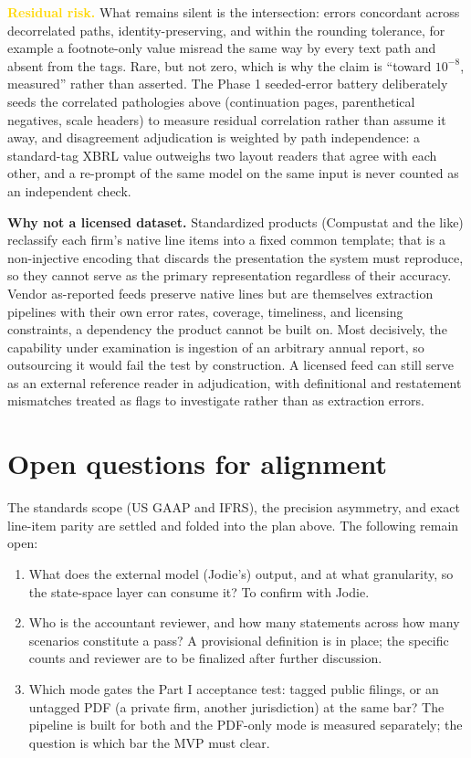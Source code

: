 \documentclass[11pt]{article}
\newcommand{\lead}[2]{\par\addvspace{5pt}\textbf{\textcolor{#1}{#2}}}
\begin{document}
\lead{gold}{Residual risk.} What remains silent is the intersection: errors concordant across decorrelated paths, identity-preserving, and within the rounding tolerance, for example a footnote-only value misread the same way by every text path and absent from the tags. Rare, but not zero, which is why the claim is ``toward $10^{-8}$, measured'' rather than asserted. The Phase 1 seeded-error battery deliberately seeds the correlated pathologies above (continuation pages, parenthetical negatives, scale headers) to measure residual correlation rather than assume it away, and disagreement adjudication is weighted by path independence: a standard-tag XBRL value outweighs two layout readers that agree with each other, and a re-prompt of the same model on the same input is never counted as an independent check.

\lead{navytwo}{Why not a licensed dataset.} Standardized products (Compustat and the like) reclassify each firm's native line items into a fixed common template; that is a non-injective encoding that discards the presentation the system must reproduce, so they cannot serve as the primary representation regardless of their accuracy. Vendor as-reported feeds preserve native lines but are themselves extraction pipelines with their own error rates, coverage, timeliness, and licensing constraints, a dependency the product cannot be built on. Most decisively, the capability under examination is ingestion of an arbitrary annual report, so outsourcing it would fail the test by construction. A licensed feed can still serve as an external reference reader in adjudication, with definitional and restatement mismatches treated as flags to investigate rather than as extraction errors.

\section{Open questions for alignment}
The standards scope (US GAAP and IFRS), the precision asymmetry, and exact line-item parity are settled and folded into the plan above. The following remain open:
\begin{enumerate}
  \item What does the external model (Jodie's) output, and at what granularity, so the state-space layer can consume it? To confirm with Jodie.
  \item Who is the accountant reviewer, and how many statements across how many scenarios constitute a pass? A provisional definition is in place; the specific counts and reviewer are to be finalized after further discussion.
  \item Which mode gates the Part I acceptance test: tagged public filings, or an untagged PDF (a private firm, another jurisdiction) at the same bar? The pipeline is built for both and the PDF-only mode is measured separately; the question is which bar the MVP must clear.
\end{enumerate}
\end{document}
